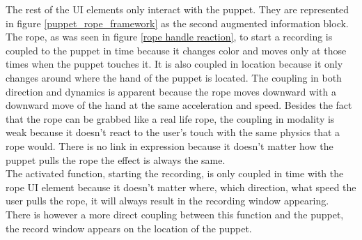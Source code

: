 The rest of the UI elements only interact with the puppet. They are represented in figure \ref{puppet_rope_framework} as the second augmented information block. The rope, as was seen in figure \ref{rope handle reaction}, to start a recording is coupled to the puppet in time because it changes color and moves only at those times when the puppet touches it. It is also coupled in location because it only changes around where the hand of the puppet is located. The coupling in both direction and dynamics is apparent because the rope moves downward with a downward move of the hand at the same acceleration and speed. Besides the fact that the rope can be grabbed like a real life rope, the coupling in modality is weak because it doesn't react to the user's touch with the same physics that a rope would. There is no link in expression because it doesn't matter how the puppet pulls the rope the effect is always the same.\\


The activated function, starting the recording, is only coupled in time with the rope UI element because it doesn't matter where, which direction, what speed the user pulls the rope, it will always result in the recording window appearing. There is however a more direct coupling between this function and the puppet, the record window appears on the location of the puppet.

